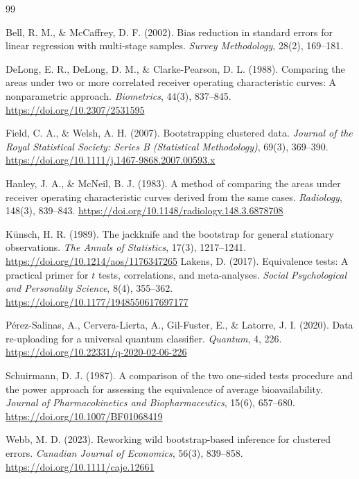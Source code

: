 \documentclass[11pt,a4paper]{article}
\begin{document}
\begin{thebibliography}{99}

Bell, R. M., \& McCaffrey, D. F. (2002). Bias reduction in standard errors for linear regression with multi-stage samples. \textit{Survey Methodology}, 28(2), 169--181.

DeLong, E. R., DeLong, D. M., \& Clarke-Pearson, D. L. (1988). Comparing the areas under two or more correlated receiver operating characteristic curves: A nonparametric approach. \textit{Biometrics}, 44(3), 837--845. \url{https://doi.org/10.2307/2531595}

Field, C. A., \& Welsh, A. H. (2007). Bootstrapping clustered data. \textit{Journal of the Royal Statistical Society: Series B (Statistical Methodology)}, 69(3), 369--390. \url{https://doi.org/10.1111/j.1467-9868.2007.00593.x}

Hanley, J. A., \& McNeil, B. J. (1983). A method of comparing the areas under receiver operating characteristic curves derived from the same cases. \textit{Radiology}, 148(3), 839--843. \url{https://doi.org/10.1148/radiology.148.3.6878708}

K\"unsch, H. R. (1989). The jackknife and the bootstrap for general stationary observations. \textit{The Annals of Statistics}, 17(3), 1217--1241. \url{https://doi.org/10.1214/aos/1176347265}
Lakens, D. (2017). Equivalence tests: A practical primer for $t$ tests, correlations, and meta-analyses. \textit{Social Psychological and Personality Science}, 8(4), 355--362. \url{https://doi.org/10.1177/1948550617697177}


P\'erez-Salinas, A., Cervera-Lierta, A., Gil-Fuster, E., \& Latorre, J. I. (2020). Data re-uploading for a universal quantum classifier. \textit{Quantum}, 4, 226. \url{https://doi.org/10.22331/q-2020-02-06-226}

Schuirmann, D. J. (1987). A comparison of the two one-sided tests procedure and the power approach for assessing the equivalence of average bioavailability. \textit{Journal of Pharmacokinetics and Biopharmaceutics}, 15(6), 657--680. \url{https://doi.org/10.1007/BF01068419}

Webb, M. D. (2023). Reworking wild bootstrap-based inference for clustered errors. \textit{Canadian Journal of Economics}, 56(3), 839--858. \url{https://doi.org/10.1111/caje.12661}

\end{thebibliography}
\end{document}
